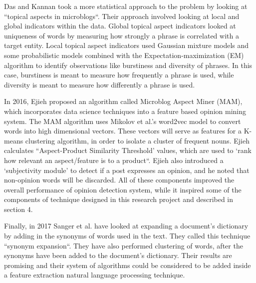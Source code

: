 \documentclass{sig-alternate}
\begin{document}
Das and Kannan\cite{DasKannan2014} took a more statistical approach to the problem by looking at ``topical aspects in microblogs``\cite{MoghaddamEster2010}. Their approach involved looking at local and global indicators within the data. Global topical aspect indicators looked at uniqueness of words by measuring how strongly a phrase is correlated with a target entity. Local topical aspect indicators used Gaussian mixture models and some probabilistic models combined with the Expectation-maximization (EM) algorithm to identify observations like burstiness and diversity of phrases. In this case, burstiness is meant to measure how frequently a phrase is used, while diversity is meant to measure how differently a phrase is used.

In 2016, Ejieh proposed an algorithm called Microblog Aspect Miner (MAM), which incorporates data science techniques into a feature based opinion mining system. The MAM algorithm uses Mikolov et al.'s word2vec model\cite{MikolovChenCorradoDean2013a} to convert words into high dimensional vectors. These vectors will serve as features for a K-means clustering algorithm, in order to isolate a cluster of frequent nouns. Ejieh calculates ``Aspect-Product Similarity Threshold' values, which are used to `rank how relevant an aspect/feature is to a product``\cite{Ejieh2016}. Ejieh also introduced a `subjectivity module' to detect if a post expresses an opinion, and he noted that non-opinion words will be discarded. All of these components improved the overall performance of opinion detection system, while it inspired some of the components of technique designed in this research project and described in section 4. 

Finally, in 2017 Sanger et al. have looked at expanding a document's dictionary by adding in the synonyms of words used in the text. They called this technique ``synonym expansion``\cite{SangerLeserKlinger2017}. They have also performed clustering of words, after the synonyms have been added to the document's dictionary. Their results are promising and their system of algorithms could be considered to be added inside a feature extraction natural language processing technique.
\end{document}
